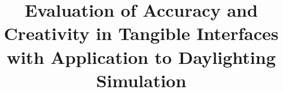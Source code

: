 \documentclass{article}
\begin{document}

 \toappear{}

%
%



\title{
Evaluation of Accuracy and Creativity in Tangible Interfaces 
  with Application to Daylighting Simulation}






\author{
}

\maketitle
\end{document}
